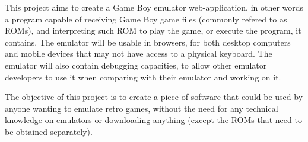 This project aims to create a Game Boy emulator web-application, in other words a program capable of receiving Game Boy game files (commonly refered to as ROMs), and interpreting such ROM to play the game, or execute the program, it contains. The emulator will be usable in browsers, for both desktop computers and mobile devices that may not have access to a physical keyboard. The emulator will also contain debugging capacities, to allow other emulator developers to use it when comparing with their emulator and working on it.

The objective of this project is to create a piece of software that could be used by anyone wanting to emulate retro games, without the need for any technical knowledge on emulators or downloading anything (except the ROMs that need to be obtained separately).
